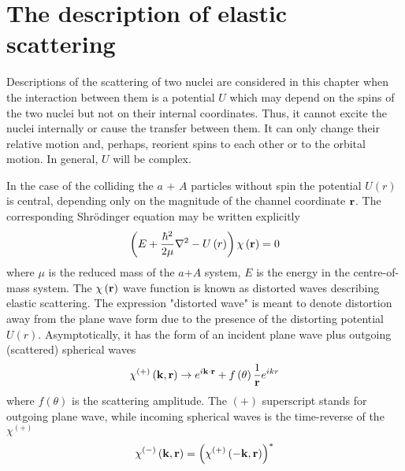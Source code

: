 \documentclass[
11pt, %
english, %
onehalfspacing, %
headsepline, %
]{MastersDoctoralThesis} %
\begin{document}
\label{Chapter1} %


\section{The description of elastic scattering}
Descriptions of the scattering of two nuclei are considered in this chapter when the interaction between them is a potential $U$ which may depend on the spins of the two nuclei but not on their internal coordinates. Thus, it cannot excite the nuclei internally or cause the transfer between them. It can only change their relative motion and, perhaps, reorient spins to each other or to the orbital motion. In general, $U$ will be complex. 

In the case of the colliding the  $a$ + $A$  particles without spin the potential $U\left( r \right)$ is central, depending only on the magnitude of the channel coordinate ${\bf r}$.
The corresponding Shr\"{o}dinger equation may be written explicitly
\begin{equation}
\left( E + \frac{\hbar^2}{2 \mu} {\bf \nabla}^2 - U \left( r \right) \right) 
\chi \left( {\bf r} \right) =0 
\label{es_she1}
\end{equation}
where $\mu$ is the reduced mass of the $a$+$A$ system, $E$ is the energy in the centre-of-mass system.
The $\chi \left( {\bf r} \right)$ wave function is known as distorted waves describing elastic scattering. The expression "distorted wave" is meant to denote distortion away from the plane wave form due to the presence   of the distorting potential $U \left( r \right)$. Asymptotically, it has the form of an incident plane wave plus outgoing (scattered) spherical waves
\begin{equation}
\chi^{(+)} \left( {\bf k}, {\bf r} \right) \rightarrow
e^{i {\bf k} \cdot {\bf r}} + f \left( \theta \right) \frac{1}{{\bf r}}
e^{i k r}
\label{es_chi_assymp_with_f}
\end{equation}
where $f \left( \theta \right)$ is the scattering amplitude. The $(+)$ superscript stands for outgoing plane wave, while incoming spherical waves is the time-reverse of the $\chi^{(+)}$
\begin{equation}
\chi^{(-)} \left( {\bf k}, {\bf r} \right) = 
\left( \chi^{(+)} \left(- {\bf k}, {\bf r} \right) \right)^{*}
\end{equation}
\end{document}
